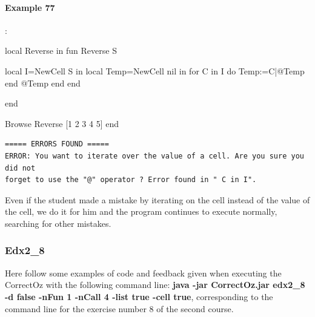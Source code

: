 \documentclass[11pt,a4paper,twoside,openright]{report}
\begin{document}
\paragraph{Example 77}:
\begin{OZ}
 local Reverse in
	fun {Reverse S}

	   local I={NewCell S} in
			local Temp={NewCell nil} in
				for C in I do
				    Temp:=C|@Temp
				end
				@Temp
			end
		end

	end

	{Browse {Reverse [1 2 3 4 5]}}
end
\end{OZ}

\begin{lstlisting}
===== ERRORS FOUND =====
ERROR: You want to iterate over the value of a cell. Are you sure you did not 
forget to use the "@" operator ? Error found in " C in I".
\end{lstlisting}

Even if the student made a mistake by iterating on the cell instead of the 
value of the cell, we do it for him and the program continues to execute 
normally, searching for other mistakes.

\subsubsection{Edx2\_8}
Here follow some examples of code and feedback given when executing 
the CorrectOz with the following command line: 
\textbf{java -jar CorrectOz.jar edx2\_8 -d false -nFun 1 -nCall 4 -list true -cell 
true}, 
corresponding to the command line for the exercise number 8 of the second 
course.
\end{document}
